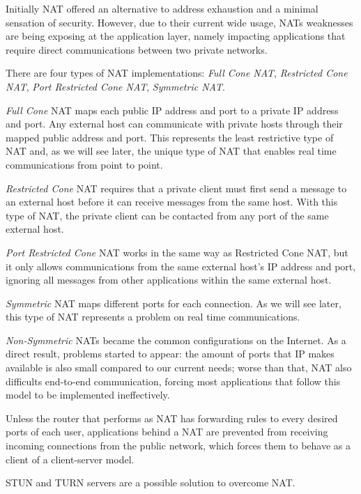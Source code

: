 \documentclass[conference,compsoc,a4paper]{IEEEtran}
\begin{document}
Initially \gls{NAT} offered an alternative to address exhaustion and a minimal sensation of security.
However, due to their current wide usage, \gls{NAT}s weaknesses are being exposing at the application layer, namely impacting applications that require direct communications between two private networks.

There are four types of \gls{NAT} implementations\cite{rfc3489}: \emph{Full Cone NAT}, \emph{Restricted Cone NAT}, \emph{Port Restricted Cone NAT}, \emph{Symmetric NAT}.

\emph{Full Cone} \gls{NAT} maps each public \gls{IP} address and port to a private \gls{IP} address and port.
Any external host can communicate with private hosts through their mapped public address and port. This represents the least restrictive type of \gls{NAT} and, as we will see later, the unique type of \gls{NAT} that enables real time communications from point to point.

\emph{Restricted Cone} \gls{NAT} requires that a private client must first send a message to an external host before it can receive messages from the same host. With this type of \gls{NAT}, the private client can be contacted from any port of the same external host.

\emph{Port Restricted Cone} \gls{NAT} works in the same way as Restricted Cone \gls{NAT}, but it only allows communications from the same external host's IP address and port, ignoring all messages from other applications within the same external host.

\emph{Symmetric} NAT maps different ports for each connection. As we will see later, this type of \gls{NAT} represents a problem on real time communications.

\emph{Non-Symmetric} \gls{NAT}s became the common configurations on the Internet. As a direct result, problems started to appear: the amount of ports that \gls{IP} makes available is also small compared to our current needs; worse than that, \gls{NAT} also difficults end-to-end communication, forcing most applications that follow this model to be implemented ineffectively.

Unless the router that performs as \gls{NAT} has forwarding rules to every desired ports of each user, applications behind a \gls{NAT} are prevented from receiving incoming connections from the public network, which forces them to behave as a client of a client-server model. 

\gls{STUN} and \gls{TURN} \cite{natvoip} servers are a possible solution to overcome \gls{NAT}. 
\end{document}
